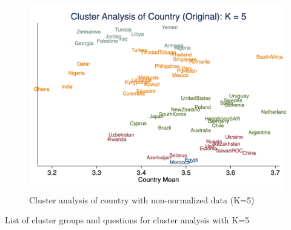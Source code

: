 \documentclass[10pt,leqno]{article}
\begin{document}
\begin{figure}  [h!]
\begin{center}
\caption{Cluster analysis of country with non-normalized data (K=5)}
\includegraphics[scale=0.25]{CA_CountryK5_ORI.png}
\end{center}
\end{figure}  

\begin{table}[tbp]
\centering
\caption{List of cluster groups and questions for cluster analysis with K=5}
\begin{adjustbox}{width=0.7\textwidth}
\small

\end{adjustbox}
\end{table}
\end{document}
